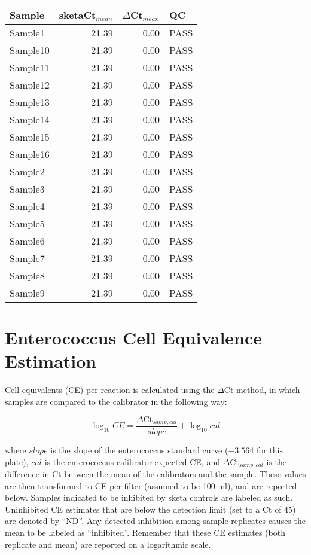 \documentclass{article}\usepackage[]{graphicx}\usepackage[]{color}
\begin{document}
\begin{table}[ht]
\centering
\begin{tabular}{lrrl}
  \hline
Sample & sketaCt$_{mean}$ & $\Delta$Ct$_{mean}$ & QC \\ 
  \hline
Sample1 & 21.39 & 0.00 & PASS \\ 
  Sample10 & 21.39 & 0.00 & PASS \\ 
  Sample11 & 21.39 & 0.00 & PASS \\ 
  Sample12 & 21.39 & 0.00 & PASS \\ 
  Sample13 & 21.39 & 0.00 & PASS \\ 
  Sample14 & 21.39 & 0.00 & PASS \\ 
  Sample15 & 21.39 & 0.00 & PASS \\ 
  Sample16 & 21.39 & 0.00 & PASS \\ 
  Sample2 & 21.39 & 0.00 & PASS \\ 
  Sample3 & 21.39 & 0.00 & PASS \\ 
  Sample4 & 21.39 & 0.00 & PASS \\ 
  Sample5 & 21.39 & 0.00 & PASS \\ 
  Sample6 & 21.39 & 0.00 & PASS \\ 
  Sample7 & 21.39 & 0.00 & PASS \\ 
  Sample8 & 21.39 & 0.00 & PASS \\ 
  Sample9 & 21.39 & 0.00 & PASS \\ 
   \hline
\end{tabular}
\end{table}


\pagebreak
\section{Enterococcus Cell Equivalence Estimation}

Cell equivalents (CE) per reaction is calculated using the $\Delta$Ct method, in which samples are compared to the calibrator
in the following way:

$$ \log_{10}{CE} = \frac{\Delta\text{Ct}_{samp, cal}}{slope} + \log_{10}{cal} $$

where $slope$ is the slope of the enterococcus standard curve (\ensuremath{-3.564} for this plate),
$cal$ is the enterococcus calibrator expected CE, and
$\Delta\text{Ct}_{samp, cal}$ is the difference in Ct between the mean of the calibrators and
the sample. These values are then transformed to CE per filter (assumed to be 100 ml), and are reported below.
Samples indicated to be inhibited by sketa controls are labeled as such. Uninhibited CE estimates that are below the detection
limit (set to a Ct of 45) are denoted by ``ND''. Any detected inhibition among sample replicates causes the mean
to be labeled as ``inhibited''. Remember that these CE estimates (both replicate and mean) are reported on a logarithmic scale.
\end{document}
